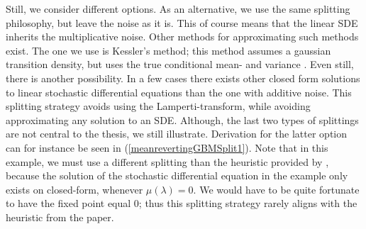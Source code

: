 Still, we consider different options. As an alternative, we use the same splitting philosophy, but leave the noise as it is. This of course means that the linear SDE inherits the multiplicative noise. Other methods for approximating such methods exist. The one we use is Kessler's method; this method assumes a gaussian transition density, but uses the true conditional mean- and variance \cite[equation (1.7)]{Kessler1997}. Even still, there is another possibility. In a few cases there exists other closed form solutions to linear stochastic differential equations than the one with additive noise. This splitting strategy avoids using the Lamperti-transform, while avoiding approximating any solution to an SDE. Although, the last two types of splittings are not central to the thesis, we still illustrate. Derivation for the latter option can for instance be seen in (\ref{meanrevertingGBMSplit1}). Note that in this example, we must use a different splitting than the heuristic provided by \cite[section 2.3 and 2.5]{SplittingSchemes}, because the solution of the stochastic differential equation in the example only exists on closed-form, whenever $\mu(\lambda) = 0$. We would have to be quite fortunate to have the fixed point equal 0; thus this splitting strategy rarely aligns with the heuristic from the paper.

